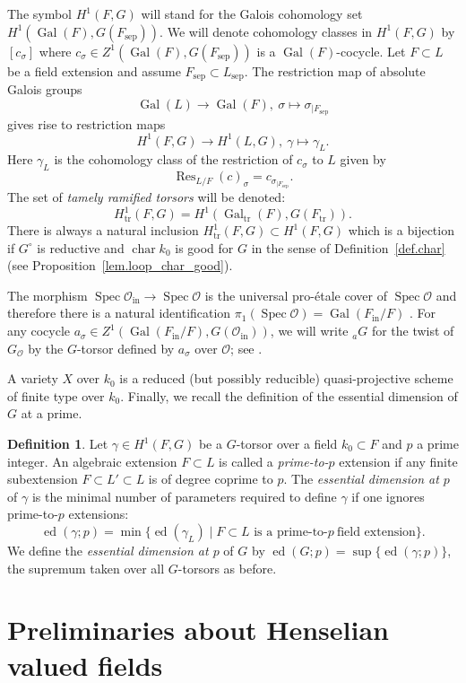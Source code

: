 \documentclass[12pt]{amsart}
\numberwithin{equation}{section}
\theoremstyle{definition}
\newtheorem{definition}[theorem]{Definition}
\newcommand{\cO}{\mathcal{O}}
\newcommand{\Gal}{\operatorname{Gal}}
\newcommand{\Spec}{\operatorname{Spec}}
\newcommand{\ed}{\operatorname{ed}}
\newcommand{\sep}{\operatorname{sep}}
\newcommand{\Char}{\operatorname{char}}
\newcommand{\tr}{\operatorname{tr}}
\newcommand{\Inf}{\operatorname{Res}}
\newcommand{\Ftr}{F_{\tr}}
\newcommand{\oin}{\operatorname{in}}
\newcommand{\Oin}{\cO_{\oin}}
\newcommand{\Fin}{F_{\oin}}
\newcommand{\Fsep}{F_{\sep}}
\newcommand{\Galtr}{\Gal_{\tr}}
\begin{document}
The symbol $H^1(F,G)$ will stand for the Galois cohomology set $H^1(\Gal(F),G(\Fsep))$. We will denote cohomology classes in $H^1(F,G)$ by $[c_\sigma]$ where $c_\sigma\in Z^1(\Gal(F),G(\Fsep))$ is a $\Gal(F)$-cocycle.  Let $F\subset L$ be a field extension and assume $\Fsep \subset L_{\sep}$. The restriction map of absolute Galois groups
$$\Gal(L) \to \Gal(F), \ \sigma\mapsto \sigma_{|\Fsep}$$
gives rise to restriction maps $$H^1(F,G) \to H^1(L,G), \  \gamma \mapsto \gamma_L.$$
Here $\gamma_L$ is the cohomology class of the restriction of $c_\sigma$ to $L$ given by $$\Inf_{L/F}(c)_\sigma = c_{\sigma_{|\Fsep}}.$$
The set of \emph{tamely ramified torsors} will be denoted:
$$H^1_{\tr}(F,G) = H^1(\Galtr(F),G(\Ftr)).$$ 
There is always a natural inclusion $H^1_{\tr}(F,G) \subset H^1(F,G)$ which is a bijection if $G^{\circ}$ is reductive and $\Char k_0$ is good for $G$ in the sense of Definition~\ref{def.char} (see Proposition~\ref{lem.loop_char_good}).


The morphism $\Spec \Oin \to \Spec \cO$ is the universal pro-\'etale cover of $\Spec \cO$ and therefore there is a natural identification $\pi_1(\Spec \cO) = \Gal(\Fin/F)$ \cite[Section 1, Example 5.2.(d)]{milne1980etale}. 
For any cocycle $a_\sigma\in Z^1(\Gal(\Fin/F),G(\Oin))$, we will write ${}_a G$ for the twist of $G_{\cO}$ by the $G$-torsor defined by $a_\sigma$ over $\cO$; see \cite[Section 2.2]{gille2016classification}.

A variety $X$ over $k_0$ is a reduced (but possibly reducible) quasi-projective scheme of finite type over $k_0$.
Finally, we recall the definition of the essential dimension of $G$ at a prime.
\begin{definition}\label{def.ess_dim_p}
     Let $\gamma\in H^1(F,G)$ be a $G$-torsor over a field $k_0\subset F$ and $p$ a prime integer. An algebraic extension $F\subset L$ is called a \emph{prime-to-$p$} extension if any finite subextension $F\subset L'\subset L$ is of degree coprime to $p$. The \emph{essential dimension at $p$} of $\gamma$ is the minimal number of parameters required to define $\gamma$ if one ignores prime-to-$p$ extensions: $$\ed(\gamma;p) = \min\Big\{\ed(\gamma_L) \mid F\subset L \text{ is a prime-to-}p \ \text{field extension}\Big\}.$$
We define the \emph{essential dimension at $p$} of $G$ by  $\ed(G;p) = \sup\{\ed(\gamma;p)\}$, the supremum taken over all $G$-torsors as before.
\end{definition}


\section{Preliminaries about Henselian valued fields}\label{sect.pre_fields}
\end{document}
